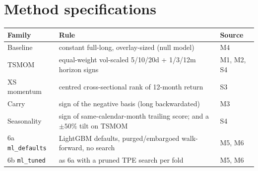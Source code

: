 \documentclass[11pt,a4paper]{article}
\begin{document}
\section{Method specifications}
\begin{table}[h]
\centering
\small
\begin{tabular}{@{}lll@{}}
\toprule
Family & Rule & Source \\
\midrule
Baseline & constant full-long, overlay-sized (null model) & M4 \\
TSMOM & equal-weight vol-scaled 5/10/20d + 1/3/12m horizon signs & M1, M2, S4 \\
XS momentum & centred cross-sectional rank of 12-month return & S3 \\
Carry & sign of the negative basis (long backwardated) & M3 \\
Seasonality & sign of same-calendar-month trailing score; and a $\pm50\%$ tilt on TSMOM & S4 \\
6a \texttt{ml\_defaults} & LightGBM defaults, purged/embargoed walk-forward, no search & M5, M6 \\
6b \texttt{ml\_tuned} & as 6a with a pruned TPE search per fold & M5, M6 \\
\bottomrule
\end{tabular}
\end{table}
\end{document}
